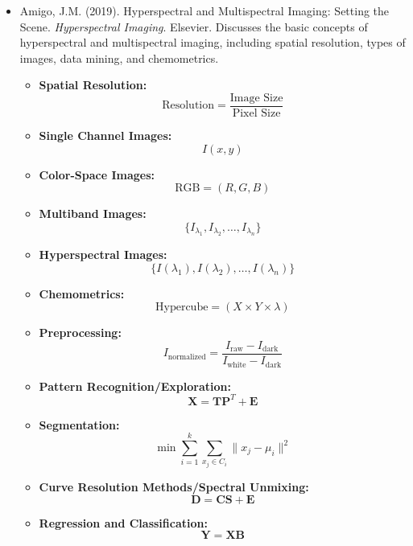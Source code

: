 \documentclass[10pt,svgnames,fragile]{beamer}
\begin{document}
\begin{frame}
\tiny
\begin{itemize}

\item Amigo, J.M. (2019). Hyperspectral and Multispectral Imaging: Setting the Scene. \textit{Hyperspectral Imaging}. Elsevier. \href{https://doi.org/10.1016/B978-0-444-63977-6.00001-8}{\color{blue}{DOI: 10.1016/B978-0-444-63977-6.00001-8}}
{\color{gray}Discusses the basic concepts of hyperspectral and multispectral imaging, including spatial resolution, types of images, data mining, and chemometrics.}
\begin{itemize} \tiny
    \item \textbf{Spatial Resolution:}
    \[
    \text{Resolution} = \frac{\text{Image Size}}{\text{Pixel Size}}
    \]
    \item \textbf{Single Channel Images:}
    \[
    I(x, y)
    \]
    \item \textbf{Color-Space Images:}
    \[
    \text{RGB} = (R, G, B)
    \]
    \item \textbf{Multiband Images:}
    \[
    \{I_{\lambda_1}, I_{\lambda_2}, \ldots, I_{\lambda_n}\}
    \]
    \item \textbf{Hyperspectral Images:}
    \[
    \{I(\lambda_1), I(\lambda_2), \ldots, I(\lambda_n)\}
    \]
    \item \textbf{Chemometrics:}
    \[
    \text{Hypercube} = (X \times Y \times \lambda)
    \]
    \item \textbf{Preprocessing:}
    \[
    I_{\text{normalized}} = \frac{I_{\text{raw}} - I_{\text{dark}}}{I_{\text{white}} - I_{\text{dark}}}
    \]
    \item \textbf{Pattern Recognition/Exploration:}
    \[
    \mathbf{X} = \mathbf{T} \mathbf{P}^T + \mathbf{E}
    \]
    \item \textbf{Segmentation:}
    \[
    \min \sum_{i=1}^{k} \sum_{x_j \in C_i} \|x_j - \mu_i\|^2
    \]
    \item \textbf{Curve Resolution Methods/Spectral Unmixing:}
    \[
    \mathbf{D} = \mathbf{C} \mathbf{S} + \mathbf{E}
    \]
    \item \textbf{Regression and Classification:}
    \[
    \mathbf{Y} = \mathbf{X} \mathbf{B}
    \]
\end{itemize}

\end{itemize}
\end{frame}
\end{document}
